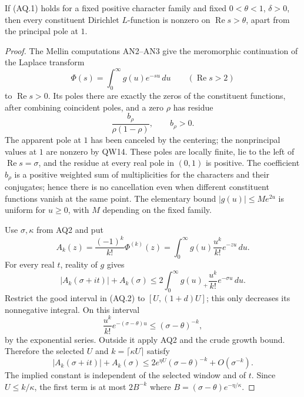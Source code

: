 \begin{theorem}
\label{claim:AQ3}
If (AQ.1) holds for a fixed positive character family and fixed
$0<\theta<1$, $\delta>0$, then every constituent Dirichlet
$L$-function is nonzero on $\operatorname{Re}s>\theta$, apart from
the principal pole at $1$.
\end{theorem}
\begin{proof}
The Mellin computations AN2--AN3 give the meromorphic continuation
of the Laplace transform
\[
 \Phi(s)=\int_0^\infty g(u)e^{-su}\,du
 \qquad(\operatorname{Re}s>2)
\]
to $\operatorname{Re}s>0$.  Its poles there are exactly the zeros of
the constituent functions, after combining coincident poles, and a
zero $\rho$ has residue
\[
 \frac{b_\rho}{\rho(1-\rho)},\qquad b_\rho>0.       \tag{AQ.5}
\]
The apparent pole at $1$ has been canceled by the centering; the
nonprincipal values at $1$ are nonzero by QW14.  These poles are
locally finite, lie to the left of $\operatorname{Re}s=\sigma$,
and the residue at every real pole in $(0,1)$ is positive.  The
coefficient $b_\rho$ is a positive weighted sum of multiplicities
for the characters and their conjugates; hence there is no
cancellation even when different constituent functions vanish at
the same point.  The elementary bound $|g(u)|\le M e^{2u}$ is
uniform for $u\ge0$, with $M$ depending on the fixed family.

Use $\sigma,\kappa$ from AQ2 and put
\[
 A_k(z)=\frac{(-1)^k}{k!}\Phi^{(k)}(z)
       =\int_0^\infty g(u)\frac{u^k}{k!}e^{-zu}\,du.
\]
For every real $t$, reality of $g$ gives
\[
 |A_k(\sigma+it)|+A_k(\sigma)
 \le 2\int_0^\infty g(u)_+\frac{u^k}{k!}e^{-\sigma u}\,du.
 \tag{AQ.6}
\]
Restrict the good interval in (AQ.2) to $[U,(1+d)U]$; this only
decreases its nonnegative integral.  On this interval
\[
 \frac{u^k}{k!}e^{-(\sigma-\theta)u}
          \le(\sigma-\theta)^{-k},
\]
by the exponential series.  Outside it apply AQ2 and the crude
growth bound.  Therefore the selected $U$ and
$k=\lceil\kappa U\rceil$ satisfy
\[
 |A_k(\sigma+it)|+A_k(\sigma)
 \le2e^{\eta U}(\sigma-\theta)^{-k}+O(\sigma^{-k}).
 \tag{AQ.7}
\]
The implied constant is independent of the selected window and of
$t$.  Since $U\le k/\kappa$, the first term is at most
$2B^{-k}$ where $B=(\sigma-\theta)e^{-\eta/\kappa}$.


\end{proof}

